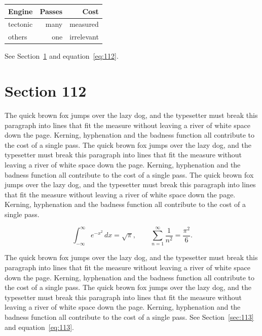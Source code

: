 \documentclass{article}
\begin{document}
\begin{center}
\begin{tabular}{lrr}
\toprule
Engine & Passes & Cost \\
\midrule
tectonic & many & measured \\
others & one & irrelevant \\
\bottomrule
\end{tabular}
\end{center}

See Section~\ref{sec:112} and equation~\eqref{eq:112}.
\section{Section 112}
\label{sec:112}
The quick brown fox jumps over the lazy dog, and the typesetter must break this paragraph into lines that fit the measure without leaving a river of white space down the page. Kerning, hyphenation and the badness function all contribute to the cost of a single pass. The quick brown fox jumps over the lazy dog, and the typesetter must break this paragraph into lines that fit the measure without leaving a river of white space down the page. Kerning, hyphenation and the badness function all contribute to the cost of a single pass. The quick brown fox jumps over the lazy dog, and the typesetter must break this paragraph into lines that fit the measure without leaving a river of white space down the page. Kerning, hyphenation and the badness function all contribute to the cost of a single pass. 

\begin{equation}\label{eq:112}
\int_{-\infty}^{\infty} e^{-x^{2}}\,dx = \sqrt{\pi}, \qquad
\sum_{n=1}^{\infty} \frac{1}{n^{2}} = \frac{\pi^{2}}{6}.
\end{equation}

The quick brown fox jumps over the lazy dog, and the typesetter must break this paragraph into lines that fit the measure without leaving a river of white space down the page. Kerning, hyphenation and the badness function all contribute to the cost of a single pass. The quick brown fox jumps over the lazy dog, and the typesetter must break this paragraph into lines that fit the measure without leaving a river of white space down the page. Kerning, hyphenation and the badness function all contribute to the cost of a single pass. 
See Section~\ref{sec:113} and equation~\eqref{eq:113}.
\end{document}
